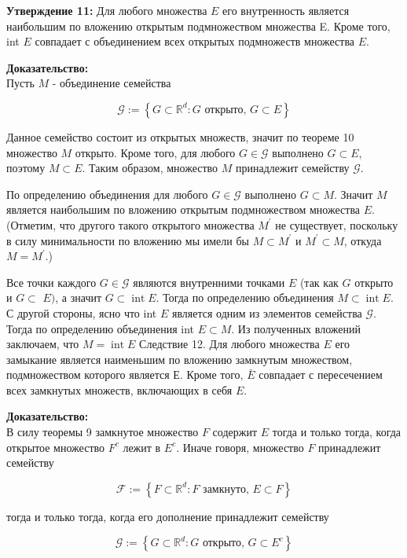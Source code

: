 \documentclass[a4paper,12pt]{article} %
\begin{document}
\textbf{Утверждение 11:} Для любого множества $E$ его внутренность является наибольшим по вложению открытым подмножеством множества E. Кроме того, int $E$ совпадает с объединением всех открытых подмножеств множества $E$.

\textbf{Доказательство:}\\
Пусть $M$ - объединение семейства

$$
\mathscr{G}:=\left\{G \subset \mathbb{R}^{d}: G \text { открыто, } G \subset E\right\}
$$

Данное семейство состоит из открытых множеств, значит по теореме 10 множество $M$ открыто. Кроме того, для любого $G \in \mathscr{G}$ выполнено $G \subset E$, поэтому $M \subset E$. Таким образом, множество $M$ принадлежит семейству $\mathscr{G}$.

По определению объединения для любого $G \in \mathscr{G}$ выполнено $G \subset M$. Значит $M$ является наибольшим по вложению открытым подмножеством множества $E$. (Отметим, что другого такого открытого множества $M^{\prime}$ не существует, поскольку в силу минимальности по вложению мы имели бы $M \subset M^{\prime}$ и $M^{\prime} \subset M$, откуда $M=M^{\prime}$.)

Все точки каждого $G \in \mathscr{G}$ являются внутренними точками $E$ (так как $G$ открыто и $G \subset$ $E)$, а значит $G \subset \operatorname{int} E$. Тогда по определению объединения $M \subset \operatorname{int} E$. С другой стороны, ясно что int $E$ является одним из элементов семейства $\mathscr{G}$. Тогда по определению объединения int $E \subset M$. Из полученных вложений заключаем, что $M=\operatorname{int} E$ Следствие 12. Для любого множества $E$ его замыкание является наименьшим по вложению замкнутым множеством, подмножеством которого является Е. Кроме того, $\bar{E}$ совпадает с пересечением всех замкнутых множеств, включающих в себя $E$.

\textbf{Доказательство:}\\
В силу теоремы 9 замкнутое множество $F$ содержит $E$ тогда и только тогда, когда открытое множество $F^{c}$ лежит в $E^{c}$. Иначе говоря, множество $F$ принадлежит семейству

$$
\mathscr{F}:=\left\{F \subset \mathbb{R}^{d}: F \text { замкнуто, } E \subset F\right\}
$$

тогда и только тогда, когда его дополнение принадлежит семейству

$$
\mathscr{G}:=\left\{G \subset \mathbb{R}^{d}: G \text { открыто, } G \subset E^{c}\right\}
$$
\end{document}
